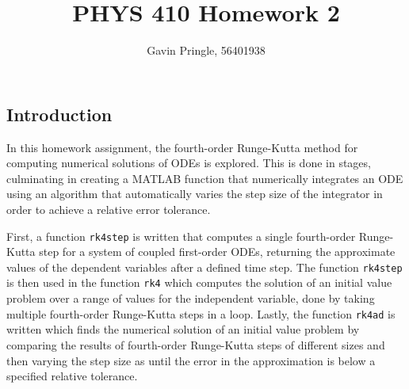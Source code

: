 \documentclass[10pt]{article}
\title{PHYS 410 Homework 2}
\author{Gavin Pringle, 56401938}
\def\code#1{\texttt{#1}} %
\begin{document}
\maketitle


\subsection*{Introduction}

In this homework assignment, the fourth-order Runge-Kutta method for computing numerical solutions of 
ODEs is explored. This is done in stages, culminating in creating a MATLAB function that numerically
integrates an ODE using an algorithm that automatically varies the step size of the integrator in order
to achieve a relative error tolerance. 

First, a function \code{rk4step} is written that computes a single fourth-order Runge-Kutta step for a 
system of coupled first-order ODEs, returning the approximate values of the dependent variables after
a defined time step. The function \code{rk4step} is then used in the function \code{rk4} which computes 
the solution of an initial value problem over a range of values for the independent variable, done by 
taking multiple fourth-order Runge-Kutta steps in a loop. Lastly, the function \code{rk4ad} is written 
which finds the numerical solution of an initial value problem by comparing the results of fourth-order 
Runge-Kutta steps of different sizes and then varying the step size as until the error in the 
approximation is below a specified relative tolerance.

\end{document}
